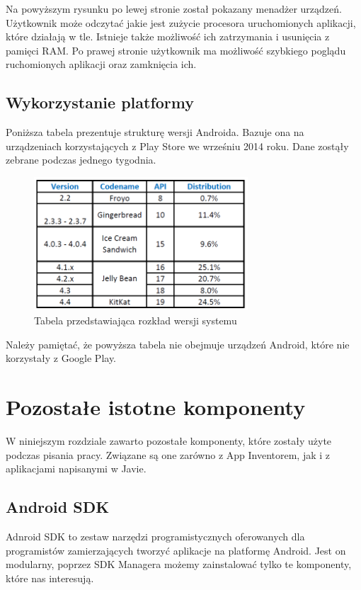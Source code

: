 Na powyższym rysunku po lewej stronie został pokazany menadżer urządzeń. Użytkownik może odczytać jakie jest zużycie procesora uruchomionych aplikacji, które działają w tle. Istnieje także możliwość ich zatrzymania i usunięcia z pamięci RAM. Po prawej stronie użytkownik ma możliwość szybkiego poglądu ruchomionych aplikacji oraz zamknięcia ich.

\subsection{Wykorzystanie platformy}

Poniższa tabela prezentuje strukturę wersji Androida. Bazuje ona na  urządzeniach korzystających z Play Store we wrześniu 2014 roku. Dane zostąły zebrane podczas jednego tygodnia.\cite{android:38}

\begin{figure}[H] 
\centering\includegraphics[width=8cm]{figures/android/distributionChart}
\caption{Tabela przedstawiająca rozkład wersji systemu}
\end{figure}


Należy pamiętać, że powyższa tabela nie obejmuje urządzeń Android, które nie korzystały z Google Play.


\section{Pozostałe istotne komponenty}

W niniejszym rozdziale zawarto pozostałe komponenty, które zostały użyte podczas pisania pracy. Związane są one zarówno z App Inventorem, jak i z aplikacjami napisanymi w Javie.

\subsection{Android SDK}

Adnroid SDK to zestaw narzędzi programistycznych oferowanych dla programistów zamierzających tworzyć aplikacje na platformę Android. Jest on modularny, poprzez SDK Managera możemy zainstalować tylko te komponenty, które nas interesują.
 
